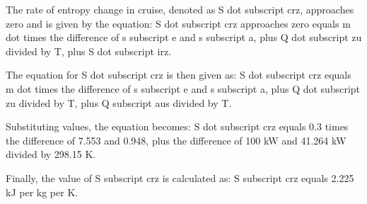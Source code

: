 The rate of entropy change in cruise, denoted as S dot subscript crz, approaches zero and is given by the equation:
S dot subscript crz approaches zero equals m dot times the difference of s subscript e and s subscript a, plus Q dot subscript zu divided by T, plus S dot subscript irz.

The equation for S dot subscript crz is then given as:
S dot subscript crz equals m dot times the difference of s subscript e and s subscript a, plus Q dot subscript zu divided by T, plus Q subscript aus divided by T.

Substituting values, the equation becomes:
S dot subscript crz equals 0.3 times the difference of 7.553 and 0.948, plus the difference of 100 kW and 41.264 kW divided by 298.15 K.

Finally, the value of S subscript crz is calculated as:
S subscript crz equals 2.225 kJ per kg per K.